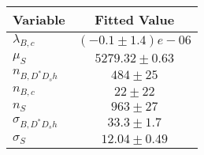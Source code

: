 \begin{tabular}[t]{lc}
\hline
Variable &Fitted Value\\
\hline\hline
$\lambda_{B,c}$&$(-0.1\pm1.4)e-06$\\
\hline
$\mu_S$&$5279.32\pm0.63$\\
\hline
$n_{B, D^* D_s h}$&$484\pm25$\\
\hline
$n_{B,c}$&$22\pm22$\\
\hline
$n_S$&$963\pm27$\\
\hline
$\sigma_{B, D^* D_s h}$&$33.3\pm1.7$\\
\hline
$\sigma_S$&$12.04\pm0.49$\\
\hline
\end{tabular}